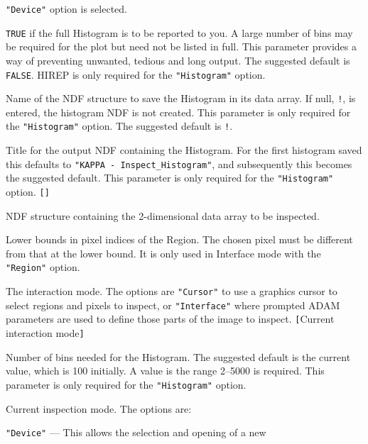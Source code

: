 \documentclass[twoside,11pt]{article}
\newcommand{\sstsubsection}[1]{ \item[{#1}] \mbox{} \\}
\renewcommand{\sstsubsection}[1]{\item[{#1}]}
\begin{document}
{{{         {\tt "Device"} option is selected.
      }
      \sstsubsection{
         HIREP = \_LOGICAL (Read)
      }{
         {\tt TRUE} if the full Histogram is to be reported to you.  A
         large number of bins may be required for the plot but need not
         be listed in full.  This parameter provides a way of preventing
         unwanted, tedious and long output.  The suggested default is
         {\tt FALSE}.  HIREP is only required for the {\tt "Histogram"} option.
      }
      \sstsubsection{
         HISTOGRAM = NDF (Read)
      }{
         Name of the NDF structure to save the Histogram in its data
         array.  If null, {\tt !}, is entered, the histogram NDF is not
         created.  This parameter is only required for the {\tt "Histogram"}
         option.  The suggested default is {\tt !}.
      }
      \sstsubsection{
         HITITLE = LITERAL (Read)
      }{
         Title for the output NDF containing the Histogram.  For the
         first histogram saved this defaults to
         {\tt "KAPPA - Inspect\_Histogram"}, and subsequently this becomes
         the suggested default.   This parameter is only required for
         the {\tt "Histogram"} option. {\tt []}
      }
      \sstsubsection{
         IN = NDF (Read)
      }{
         NDF structure containing the 2-dimensional data array to be inspected.
      }
      \sstsubsection{
         LBOUND( 2 ) = \_INTEGER (Read)
      }{
         Lower bounds in pixel indices of the Region.  The chosen pixel
         must be different from that at the lower bound.  It is only
         used in Interface mode with the {\tt "Region"} option.
      }
      \sstsubsection{
         MODE = LITERAL (Read)
      }{
         The interaction mode.  The options are {\tt "Cursor"} to use a
         graphics cursor to select regions and pixels to inspect,
         or {\tt "Interface"} where prompted ADAM parameters are used to
         define those parts of the image to inspect. {\tt [}Current
         interaction mode{\tt ]}
      }
      \sstsubsection{
         NUMBIN = \_INTEGER (Read)
      }{
         Number of bins needed for the Histogram.  The suggested default
         is the current value, which is 100 initially.  A value is the
         range 2--5000 is required.  This parameter is only required
         for the {\tt "Histogram"} option.
      }
      \sstsubsection{
         OPTION = LITERAL (Read)
      }{
         Current inspection mode.  The options are:
         \begin{description}
         \item {\tt "Device"} --- This allows the selection and opening of a new

\end{description}}}}
\end{document}
